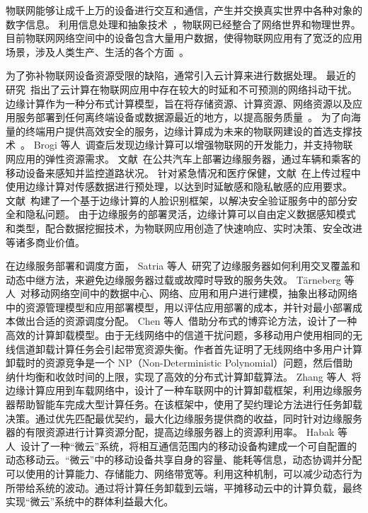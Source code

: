 物联网能够让成千上万的设备进行交互和通信，产生并交换真实世界中各种对象的数字信息。
利用信息处理和抽象技术~\cite{DBLP:journals/iotj/GanzPBC15}，物联网已经整合了网络世界和物理世界。
目前物联网网络空间中的设备包含大量用户数据，使得物联网应用有了宽泛的应用场景，涉及人类生产、生活的各个方面~\cite{DBLP:journals/cm/WangYXJD17}。

为了弥补物联网设备资源受限的缺陷，通常引入云计算来进行数据处理。
最近的研究~\cite{DBLP:journals/iotj/RazzaqueMPC16}指出了云计算在物联网应用中存在较大的时延和不可预测的网络抖动干扰。
边缘计算作为一种分布式计算模型，旨在将存储资源、计算资源、网络资源以及应用服务部署到任何离终端设备或数据源最近的地方，以提高服务质量~\cite{AI201877}。
为了向海量的终端用户提供高效安全的服务，边缘计算成为未来的物联网建设的首选支撑技术~\cite{DBLP:journals/iotj/LinYZYZZ17}。
Brogi 等人~\cite{DBLP:Journals/IOTj/BroGif17}调查后发现边缘计算可以增强物联网的开发能力，并支持物联网应用的弹性资源需求。
文献~在公共汽车上部署边缘服务器，通过车辆和乘客的移动设备来感知并监控道路状况。
针对紧急情况和医疗保健，文献~在上传过程中使用边缘计算对传感数据进行预处理，以达到时延敏感和隐私敏感的应用要求。
文献~构建了一个基于边缘计算的人脸识别框架，以解决安全验证服务中的部分安全和隐私问题。
由于边缘服务的部署灵活，边缘计算可以自由定义数据感知模式和类型，配合数据挖掘技术，为物联网应用创造了快速响应、实时决策、安全改进等诸多商业价值。

在边缘服务部署和调度方面，
Satria 等人~\cite{DBLP:journals/fgcs/SatriaPJ17}研究了边缘服务器如何利用交叉覆盖和动态中继方法，来避免边缘服务器过载或故障时导致的服务失效。
T{\"{a}}rneberg 等人~\cite{DBLP:journals/fgcs/TarnebergMWTEKE17}对移动网络空间中的数据中心、网络、应用和用户进行建模，抽象出移动网络中的资源管理模型和应用部署模型，用以评估应用部署的成本，并针对最小部署成本做出合适的资源调度分配。
Chen 等人~\cite{DBLP:journals/ton/ChenJLF16}借助分布式的博弈论方法，设计了一种高效的计算卸载模型。由于无线网络中的信道干扰问题，多移动用户使用相同的无线信道卸载计算任务会引起带宽资源失衡。作者首先证明了无线网络中多用户计算卸载时的资源竞争是一个 NP（Non-Deterministic Polynomial）问题，然后借助纳什均衡和收敛时间的上限，实现了高效的分布式计算卸载算法。
Zhang 等人~\cite{DBLP:conf/rndm/ZhangMLV016}将边缘计算应用到车载网络中，设计了一种车联网中的计算卸载框架，利用边缘服务器帮助智能车完成大型计算任务。在该框架中，使用了契约理论方法进行任务卸载决策。通过优先匹配最优契约，最大化边缘服务提供商的收益，同时针对边缘服务器的有限资源进行计算资源分配，提高边缘服务器上的资源利用率。
Habak 等人~\cite{DBLP:conf/IEEEcloud/HabakAHZ15}设计了一种“微云”系统，将相互通信范围内的移动设备构建成一个可自配置的动态移动云。“微云”中的移动设备共享自身的容量、能耗等信息，动态协调并分配可以使用的计算能力、存储能力、网络带宽等。利用这种机制，可以减少动态行为所带给系统的波动。通过将计算任务卸载到云端，平摊移动云中的计算负载，最终实现“微云”系统中的群体利益最大化。


